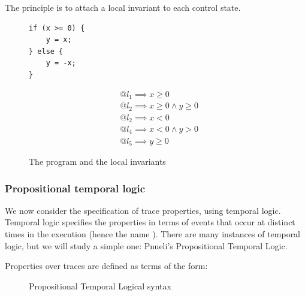 \documentclass[toc, titlepaged]{../cs-classes/cs-classes}
\begin{document}
\begin{example}
    The principle is to attach a local invariant to each control state.

    \begin{figure}[!ht]
        \centering
        \begin{minipage}{0.2\textwidth}
            \centering
            \begin{verbatim}
if (x >= 0) {
    y = x;
} else {
    y = -x;
}
            \end{verbatim}
        \end{minipage}
        \begin{minipage}{.5\textwidth}
          \begin{equation*}
            \begin{aligned}
                &@l_1 \implies x\geq 0\\
                &@l_2 \implies x\geq 0 \land y\geq 0\\
                &@l_2 \implies x<0\\
                &@l_4 \implies x<0 \land y>0\\
                &@l_5 \implies y\geq 0
            \end{aligned}
          \end{equation*}
        \end{minipage}
        \caption{The program and the local invariants}
    \end{figure}
\end{example}

\subsubsection{Propositional temporal logic}
We now consider the specification of trace properties, using temporal logic. Temporal logic specifies the properties in terms of events that occur at distinct times in the execution (hence the name ). There are many instances of temporal logic, but we will study a simple one: Pnueli's Propositional Temporal Logic. 

\begin{definition}
    Properties over traces are defined as terms of the form:
    \begin{figure}[H]
        \centering
        \begin{mgrammar}
        \end{mgrammar}
        \caption{Propositional Temporal Logical syntax}
    \end{figure}
\end{definition}
\end{document}
